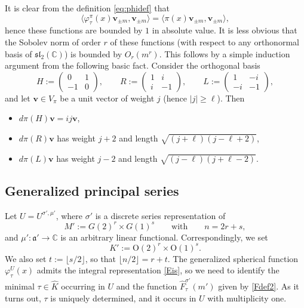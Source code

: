 \documentclass[11pt,oneside]{amsart}
\numberwithin{equation}{section}
\theoremstyle{remark}
\theoremstyle{plain}
\newcommand\OO{\mathrm{O}}
\newcommand\CC{\mathbb{C}}
\newcommand\mfa{\mathfrak{a}}
\newcommand{\bv}{\mathbf{v}}
\renewcommand\geq{\geqslant}
\begin{document}
It is clear from the definition \eqref{eq:phidef} that
\[\langle\varphi_\tau^\pi(x)\bv_{\pm m},\bv_{\pm m}\rangle=\langle\pi(x)\bv_{\pm m},\bv_{\pm m}\rangle,\]
hence these functions are bounded by $1$ in absolute value. It is less obvious that the Sobolev norm of order $r$ of these functions (with respect to any orthonormal basis of $\mathfrak{sl}_2(\CC)$) is bounded by $O_r(m^r)$. This follows by a simple induction argument from the following basic fact. Consider the orthogonal basis
\[
H:=\begin{pmatrix}0&1\\-1&0\end{pmatrix},\qquad
R:=\begin{pmatrix}1&i\\i&-1\end{pmatrix},\qquad
L:=\begin{pmatrix}1&-i\\-i&-1\end{pmatrix},
\]
and let $\bv\in V_\pi$ be a unit vector of weight $j$ (hence $|j|\geq\ell$). Then 
\begin{itemize}
\item $d\pi(H)\bv=ij\bv$,
\item $d\pi(R)\bv$ has weight $j+2$ and length $\sqrt{(j+\ell)(j-\ell+2)}$,
\item $d\pi(L)\bv$ has weight $j-2$ and length $\sqrt{(j-\ell)(j+\ell-2)}$.
\end{itemize}

\subsection{Generalized principal series}\label{minimalKtype}
Let $U=U^{\sigma',\mu'}$, where $\sigma'$ is a discrete series representation of
\begin{equation}\label{Mprimedecomposition}
M':=G(2)^r\times G(1)^s\qquad\text{with}\qquad n=2r+s,
\end{equation}
and $\mu':\mfa'\to\CC$ is an arbitrary linear functional. Correspondingly, we set
\[K':=\OO(2)^r\times\OO(1)^s.\]
We also set $t:=\lfloor s/2\rfloor$, so that $\lfloor n/2\rfloor = r+t$. The generalized spherical function $\varphi_\tau^U(x)$ admits the integral representation \eqref{Eis}, so we need to identify the minimal $\tau\in\widehat{K}$ occurring in $U$ and the function $\hat F_\tau^{\sigma'}(m')$ given by \eqref{Fdef2}. As it turns out, $\tau$ is uniquely determined, and it occurs in $U$ with multiplicity one.
\end{document}
